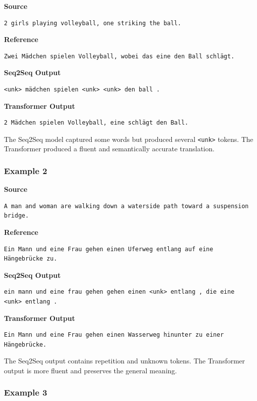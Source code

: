 \documentclass[11pt,a4paper]{article}
\begin{document}
\textbf{Source}
\begin{lstlisting}
2 girls playing volleyball, one striking the ball.
\end{lstlisting}

\textbf{Reference}
\begin{lstlisting}
Zwei Mädchen spielen Volleyball, wobei das eine den Ball schlägt.
\end{lstlisting}

\textbf{Seq2Seq Output}
\begin{lstlisting}
<unk> mädchen spielen <unk> <unk> den ball .
\end{lstlisting}

\textbf{Transformer Output}
\begin{lstlisting}
2 Mädchen spielen Volleyball, eine schlägt den Ball.
\end{lstlisting}

The Seq2Seq model captured some words but produced several \texttt{<unk>} tokens. The Transformer produced a fluent and semantically accurate translation.

\subsubsection{Example 2}

\textbf{Source}
\begin{lstlisting}
A man and woman are walking down a waterside path toward a suspension bridge.
\end{lstlisting}

\textbf{Reference}
\begin{lstlisting}
Ein Mann und eine Frau gehen einen Uferweg entlang auf eine Hängebrücke zu.
\end{lstlisting}

\textbf{Seq2Seq Output}
\begin{lstlisting}
ein mann und eine frau gehen gehen einen <unk> entlang , die eine <unk> entlang .
\end{lstlisting}

\textbf{Transformer Output}
\begin{lstlisting}
Ein Mann und eine Frau gehen einen Wasserweg hinunter zu einer Hängebrücke.
\end{lstlisting}

The Seq2Seq output contains repetition and unknown tokens. The Transformer output is more fluent and preserves the general meaning.

\subsubsection{Example 3}
\end{document}
